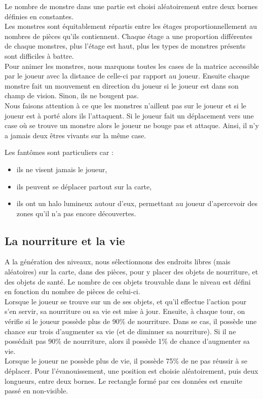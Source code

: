 \documentclass[11pt]{report}
\begin{document}
		Le nombre de monstre dans une partie est choisi aléatoirement entre deux bornes définies en constantes.\\
		Les monstres sont équitablement répartis entre les étages proportionnellement au nombres de pièces qu'ils contiennent. Chaque étage a une proportion différentes de chaque monstres, plus l'étage est haut, plus les types de monstres présents sont difficiles à battre.\\
		Pour animer les monstres, nous marquons toutes les cases de la matrice accessible par le joueur avec la distance de celle-ci par rapport au joueur. Ensuite chaque monstre fait un mouvement en direction du joueur si le joueur est dans son champ de vision. Sinon, ils ne bougent pas.\\
		Nous faisons attention à ce que les monstres n'aillent pas sur le joueur et si le joueur est à porté alors ils l'attaquent. Si le joueur fait un déplacement vers une case où se trouve un monstre alors le joueur ne bouge pas et attaque. Ainsi, il n'y a jamais deux êtres vivants sur la même case.
		
		Les fantômes sont particuliers car :
		\begin{itemize}
			\item ils ne visent jamais le joueur,
			\item ils peuvent se déplacer partout sur la carte,
			\item ils ont un halo lumineux autour d'eux, permettant au joueur d'apercevoir des zones qu'il n'a pas encore découvertes.
		\end{itemize}
		
		\subsection{La nourriture et la vie}
		
		A la génération des niveaux, nous sélectionnons des endroits libres (mais aléatoires) sur la carte, dans des pièces, pour y placer des objets de nourriture, et des objets de santé. Le nombre de ces objets trouvable dans le niveau est défini en fonction du nombre de pièces de celui-ci. \\ Lorsque le joueur se trouve sur un de ses objets, et qu'il effectue l'action pour s'en servir, sa nourriture ou sa vie est mise à jour. Ensuite, à chaque tour, on vérifie si le joueur possède plus de 90\% de nourriture. Dans se cas, il possède une chance sur trois d'augmenter sa vie (et de diminuer sa nourriture). Si il ne possédait pas 90\% de nourriture, alors il possède 1\% de chance d'augmenter sa vie.\\
		Lorsque le joueur ne possède plus de vie, il possède 75\% de ne pas réussir à se déplacer. Pour l'évanouissement, une position est choisie aléatoirement, puis deux longueurs, entre deux bornes. Le rectangle formé par ces données est ensuite passé en non-visible.
		
\end{document}
